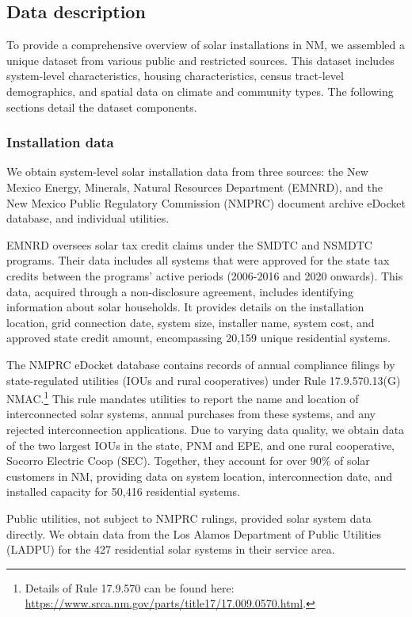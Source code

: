 \documentclass[12pt,twoside,letterpaper]{article}
\begin{document}
\subsection{Data description}
\label{section:data_collect}

To provide a comprehensive overview of solar installations in NM, we assembled a unique dataset from various public and restricted sources. This dataset includes system-level characteristics, housing characteristics, census tract-level demographics, and spatial data on climate and community types. The following sections detail the dataset components.

\subsubsection{Installation data}

We obtain system-level solar installation data from three sources: the New Mexico Energy, Minerals, Natural Resources Department (EMNRD), and the New Mexico Public Regulatory Commission (NMPRC) document archive eDocket database, and individual utilities. 

EMNRD oversees solar tax credit claims under the SMDTC and NSMDTC programs. Their data includes all systems that were approved for the state tax credits between the programs' active periods (2006-2016 and 2020 onwards). This data, acquired through a non-disclosure agreement, includes identifying information about solar households. It provides details on the installation location, grid connection date, system size, installer name, system cost, and approved state credit amount, encompassing 20,159 unique residential systems.

The NMPRC eDocket database contains records of annual compliance filings by state-regulated utilities (IOUs and rural cooperatives) under Rule 17.9.570.13(G) NMAC.\footnote{Details of Rule 17.9.570 can be found here: \url{https://www.srca.nm.gov/parts/title17/17.009.0570.html}.} This rule mandates utilities to report the name and location of interconnected solar systems, annual purchases from these systems, and any rejected interconnection applications. Due to varying data quality, we obtain data of the two largest IOUs in the state, PNM and EPE, and one rural cooperative, Socorro Electric Coop (SEC). Together, they account for over 90\% of solar customers in NM, providing data on system location, interconnection date, and installed capacity for 50,416 residential systems.

Public utilities, not subject to NMPRC rulings, provided solar system data directly. We obtain data from the Los Alamos Department of Public Utilities (LADPU) for the 427 residential solar systems in their service area.
\end{document}
